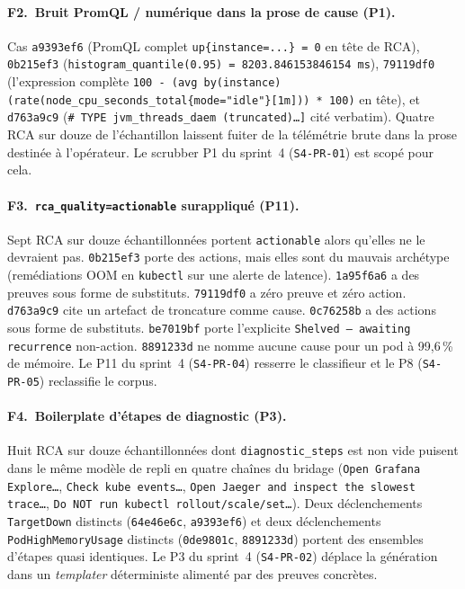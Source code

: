 \documentclass[11pt,a4paper,oneside]{report}
\begin{document}
\paragraph{F2.~Bruit PromQL / numérique dans la prose de cause (P1).}
Cas \texttt{a9393ef6} (PromQL complet
\texttt{up\{instance=...\} = 0} en tête de RCA), \texttt{0b215ef3}
(\texttt{histogram\_quantile(0.95) = 8203.846153846154 ms}),
\texttt{79119df0} (l'expression complète
\texttt{100 - (avg by(instance) (rate(node\_cpu\_seconds\_total\{mode="idle"\}[1m])) * 100)}
en tête), et \texttt{d763a9c9} (\texttt{\# TYPE
jvm\_threads\_daem (truncated)\ldots]} cité verbatim). Quatre RCA
sur douze de l'échantillon laissent fuiter de la télémétrie brute
dans la prose destinée à l'opérateur. Le scrubber P1 du sprint~4
(\texttt{S4-PR-01}) est scopé pour cela.

\paragraph{F3.~\texttt{rca\_quality=actionable} surappliqué (P11).}
Sept RCA sur douze échantillonnées portent \texttt{actionable}
alors qu'elles ne le devraient pas. \texttt{0b215ef3} porte des
actions, mais elles sont du mauvais archétype (remédiations OOM en
\texttt{kubectl} sur une alerte de latence). \texttt{1a95f6a6} a
des preuves sous forme de substituts. \texttt{79119df0} a zéro
preuve et zéro action. \texttt{d763a9c9} cite un artefact de
troncature comme cause. \texttt{0c76258b} a des actions sous forme
de substituts. \texttt{be7019bf} porte l'explicite
\texttt{Shelved --- awaiting recurrence} non-action.
\texttt{8891233d} ne nomme aucune cause pour un pod à 99,6\,\% de
mémoire. Le P11 du sprint~4 (\texttt{S4-PR-04}) resserre le
classifieur et le P8 (\texttt{S4-PR-05}) reclassifie le corpus.

\paragraph{F4.~Boilerplate d'étapes de diagnostic (P3).}
Huit RCA sur douze échantillonnées dont \texttt{diagnostic\_steps}
est non vide puisent dans le même modèle de repli en quatre chaînes
du bridage (\texttt{Open Grafana Explore\ldots},
\texttt{Check kube events\ldots}, \texttt{Open Jaeger and inspect
the slowest trace\ldots}, \texttt{Do NOT run kubectl
rollout/scale/set\ldots}). Deux déclenchements \texttt{TargetDown}
distincts (\texttt{64e46e6c}, \texttt{a9393ef6}) et deux
déclenchements \texttt{PodHighMemoryUsage} distincts
(\texttt{0de9801c}, \texttt{8891233d}) portent des ensembles
d'étapes quasi identiques. Le P3 du sprint~4 (\texttt{S4-PR-02})
déplace la génération dans un \emph{templater} déterministe
alimenté par des preuves concrètes.
\end{document}
